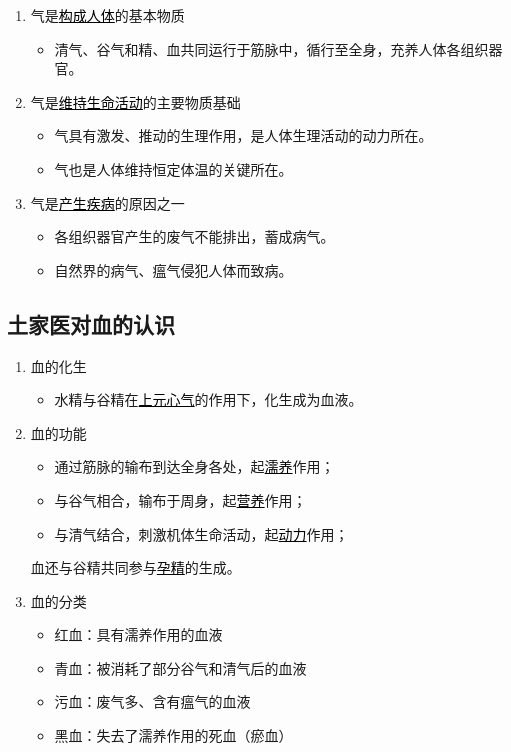 \documentclass[cn,hazy,black,12pt,normal,founder]{elegantnote}
\newcommand{\redt}[1]{\textcolor{black}{{}#1}}      %
\begin{document}
\begin{enumerate}
  \item 气是\redt{\uline{构成人体}}的基本物质
  \begin{itemize}
    \item 清气、谷气和精、血共同运行于筋脉中，循行至全身，充养人体各组织器官。
  \end{itemize}
  \item 气是\redt{\uline{维持生命活动}}的主要物质基础
  \begin{itemize}
    \item 气具有激发、推动的生理作用，是人体生理活动的动力所在。
    \item 气也是人体维持恒定体温的关键所在。
  \end{itemize}
  \item 气是\redt{\uline{产生疾病}}的原因之一
  \begin{itemize}
    \item 各组织器官产生的废气不能排出，蓄成病气。
    \item 自然界的病气、瘟气侵犯人体而致病。
  \end{itemize}
\end{enumerate}

\subsection{土家医对血的认识}

\begin{enumerate}
  \item 血的化生
  \begin{itemize}
    \item 水精与谷精在\redt{\uline{上元心气}}的作用下，化生成为血液。
  \end{itemize}
  \item 血的功能
  \begin{itemize}
    \item 通过筋脉的输布到达全身各处，起\redt{\uline{濡养}}作用；
    \item 与谷气相合，输布于周身，起\redt{\uline{营养}}作用；
    \item 与清气结合，刺激机体生命活动，起\redt{\uline{动力}}作用；
  \end{itemize}
  \begin{note}
    血还与谷精共同参与\redt{\uline{孕精}}的生成。
  \end{note}
  \item 血的分类
  \begin{itemize}
    \item 红血：具有濡养作用的血液
    \item 青血：被消耗了部分谷气和清气后的血液
    \item 污血：废气多、含有瘟气的血液
    \item 黑血：失去了濡养作用的死血（瘀血）
  \end{itemize}
\end{enumerate}
\end{document}
